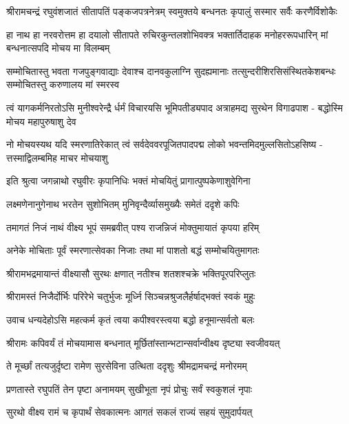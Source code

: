 \twolineshloka
{श्रीरामचन्द्रं रघुवंशजातं सीतापतिं पङ्कजपत्रनेत्रम्}
{स्वमुक्तये बन्धनतः कृपालुं सस्मार सर्वैः करणैर्विशोकैः}%


\fourlineindentedshloka
{हा नाथ हा नरवरोत्तम हा दयालो}
{सीतापते रुचिरकुन्तलशोभिवक्त्र}
{भक्तार्तिदाहक मनोहररूपधारिन्}
{मां बन्धनात्सपदि मोचय मा विलम्बम्}%

\fourlineindentedshloka
{सम्मोचितास्तु भवता गजपुङ्गवाद्याः}
{देवाश्च दानवकुलाग्नि सुदह्यमानाः}
{तत्सुन्दरीशिरसिसंस्थितकेशबन्धः}
{सम्मोचितस्तु करुणालय मां स्मरस्व}%

\fourlineindentedshloka
{त्वं यागकर्मनिरतोऽसि मुनीश्वरेन्द्रै}
{र्धर्मं विचारयसि भूमिपतीड्यपाद}
{अत्राहमद्य सुरथेन विगाढपाश -}
{बद्धोस्मि मोचय महापुरुषाशु देव}%

\fourlineindentedshloka
{नो मोचयस्यथ यदि स्मरणातिरेकात्}
{त्वं सर्वदेववरपूजितपादपद्म}
{लोको भवन्तमिदमुल्लसितोऽहसिष्य -}
{त्तस्माद्विलम्बमिह माचर मोचयाशु}%

\twolineshloka
{इति श्रुत्वा जगन्नाथो रघुवीरः कृपानिधिः}
{भक्तं मोचयितुं प्रागात्पुष्पकेणाशुवेगिना}%

\twolineshloka
{लक्ष्मणेनानुगेनाथ भरतेन सुशोभितम्}
{मुनिवृन्दैर्व्यासमुख्यैः समेतं ददृशे कपिः}%

\twolineshloka
{तमागतं निजं नाथं वीक्ष्य भूपं समब्रवीत्}
{पश्य राजन्निजं मोक्तुमायातं कृपया हरिम्}%

\twolineshloka
{अनेके मोचिताः पूर्वं स्मरणात्सेवका निजाः}
{तथा मां पाशतो बद्धं सम्मोचयितुमागतः}%

\twolineshloka
{श्रीरामभद्रमायान्तं वीक्ष्यासौ सुरथः क्षणात्}
{नतीश्च शतशश्चक्रे भक्तिपूरपरिप्लुतः}%

\twolineshloka
{श्रीरामस्तं निजैर्दोर्भिः परिरेभे चतुर्भुजः}
{मूर्ध्नि सिञ्चन्नश्रुजलैर्हर्षाद्भक्तं स्वकं मुहुः}%

\twolineshloka
{उवाच धन्यदेहोऽसि महत्कर्म कृतं त्वया}
{कपीश्वरस्त्वया बद्धो हनूमान्सर्वतो बलः}%

\twolineshloka
{श्रीरामः कपिवर्यं तं मोचयामास बन्धनात्}
{मूर्छितांस्तान्भटान्सर्वान्वीक्ष्य दृष्ट्या स्वजीवयत्}%

\twolineshloka
{ते मूर्च्छां तत्यजुर्दृष्टा रामेण सुरसेविना}
{उत्थिता ददृशुः श्रीमद्रामचन्द्रं मनोरमम्}%

\twolineshloka
{प्रणतास्ते रघुपतिं तेन पृष्टा अनामयम्}
{सुखीभूता नृपं प्रोचुः सर्वं स्वकुशलं नृपाः}%

\twolineshloka
{सुरथो वीक्ष्य रामं च कृपार्थं सेवकात्मनः}
{आगतं सकलं राज्यं सहयं सुमुदार्पयत्}%

